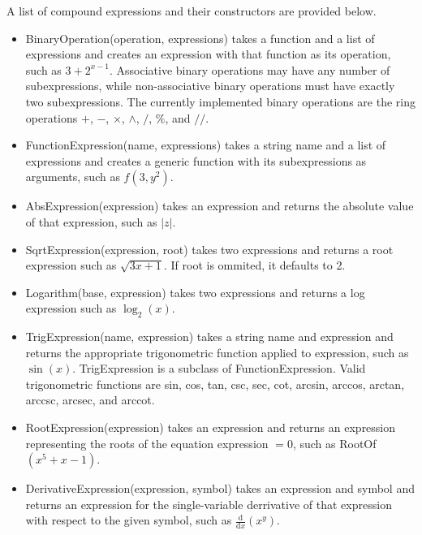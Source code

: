 \documentclass{article}
\begin{document}
A list of compound expressions and their constructors are provided below.

\begin{itemize}
    \item {\ttfamily BinaryOperation(operation, expressions)} takes a function and a list of expressions and creates an expression with that function as its operation, such as $3+2^{x-1}$. Associative binary operations may have any number of subexpressions, while non-associative binary operations must have exactly two subexpressions. The currently implemented binary operations are the ring operations $+$, $-$, $\times$, $\wedge$, $/$, $\%$, and $//$.
    
    \item {\ttfamily FunctionExpression(name, expressions)} takes a string name and a list of expressions and creates a generic function with its subexpressions as arguments, such as $f(3, y^2)$. 
    
    \item {\ttfamily AbsExpression(expression)} takes an expression and returns the absolute value of that expression, such as $|z|$.
    
    \item {\ttfamily SqrtExpression(expression, root)} takes two expressions and returns a root expression such as $\sqrt{3x+1}$. If {\ttfamily root} is ommited, it defaults to 2.
    
    \item {\ttfamily Logarithm(base, expression)} takes two expressions and returns a log expression such as $\log_2(x)$.
    
    \item {\ttfamily TrigExpression(name, expression)} takes a string name and expression and returns the appropriate trigonometric function applied to {\ttfamily expression}, such as $\sin(x)$. {\ttfamily TrigExpression} is a subclass of {\ttfamily FunctionExpression}. Valid trigonometric functions are sin, cos, tan, csc, sec, cot, arcsin, arccos, arctan, arccsc, arcsec, and arccot.
    
    \item {\ttfamily RootExpression(expression)} takes an expression and returns an expression representing the roots of the equation {\ttfamily expression} $= 0$, such as RootOf$(x^5+x-1)$.
    
    \item {\ttfamily DerivativeExpression(expression, symbol)} takes an expression and symbol and returns an expression for the single-variable derrivative of that expression with respect to the given symbol, such as $\frac{\mathrm{d}}{\mathrm{d}x}(x^y)$.
    

\end{itemize}
\end{document}
